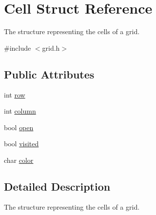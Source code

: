 \hypertarget{structCell}{\section{Cell Struct Reference}
\label{structCell}
}


The structure representing the cells of a grid.  




{\ttfamily \#include $<$grid.\-h$>$}

\subsection*{Public Attributes}
\begin{DoxyCompactItemize}
\item 
int \hyperlink{structCell_a85d2a7af6195f5196574790fbc1becfd}{row}
\item 
int \hyperlink{structCell_a6aae9428106f7cd7574660e3c2278ee0}{column}
\item 
bool \hyperlink{structCell_a415f03ff30c2bc8c170ee592beb1ef26}{open}
\item 
bool \hyperlink{structCell_ac0fdf52adc7d9dd8c5de95635ff04de3}{visited}
\item 
char \hyperlink{structCell_ad53d9424dcb05dceaa0433b5fceecbed}{color}
\end{DoxyCompactItemize}


\subsection{Detailed Description}
The structure representing the cells of a grid. 

